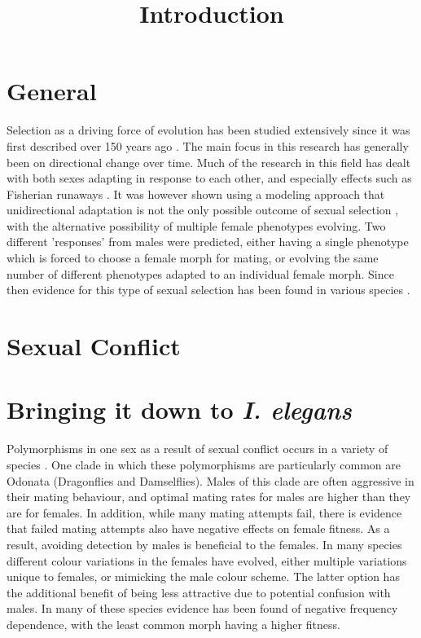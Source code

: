 \documentclass{article}
\title{Introduction}
\date{\vspace{-5ex}}
\begin{document}
\maketitle

\section{General}
Selection as a driving force of evolution has been studied extensively since it was first described over 150 years ago \cite{Darwin1859, Wallace1858}. The main focus in this research has generally been on directional change over time. Much of the research in this field has dealt with both sexes adapting in response to each other, and especially effects such as Fisherian runaways \cite{Fisher1915}. It was however shown using a modeling approach that unidirectional adaptation is not the only possible outcome of sexual selection \cite{Gavrilets2002}, with the alternative possibility of multiple female phenotypes evolving. Two different 'responses' from males were predicted, either having a single phenotype which is forced to choose a female morph for mating, or evolving the same number of different phenotypes adapted to an individual female morph. Since then evidence for this type of sexual selection has been found in various species \cite{Hardling2006,Kagawa2016,Svensson2007}.

\section{Sexual Conflict}
\cite{Chapman2003}


\section{Bringing it down to \textit{I. elegans}}
Polymorphisms in one sex as a result of sexual conflict occurs in a variety of species \cite{Needed}. One clade in which these polymorphisms are particularly common are Odonata (Dragonflies and Damselflies). Males of this clade are often aggressive in their mating behaviour, and optimal mating rates for males are higher than they are for females. In addition, while many mating attempts fail, there is evidence that failed mating attempts also have negative effects on female fitness. As a result, avoiding detection by males is beneficial to the females. In many species different colour variations in the females have evolved, either multiple variations unique to females, or mimicking the male colour scheme. The latter option has the additional benefit of being less attractive due to potential confusion with males. In many of these species evidence has been found of negative frequency dependence, with the least common morph having a higher fitness.
\end{document}

